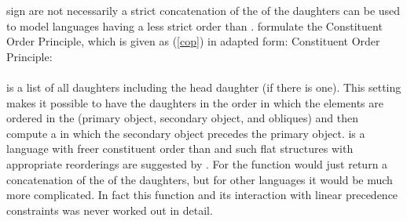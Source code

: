 \documentclass[output=paper,biblatex,babelshorthands,newtxmath,draftmode,colorlinks,citecolor=brown]{langscibook}
\begin{document}
sign are not necessarily a strict concatenation of the \phonvs of the daughters can be used to model
languages having a less strict order than . \citet[]{ps} formulate the Constituent
Order Principle, which is given as (\ref{cop}) in adapted form:
\ea
\label{cop}
Constituent Order Principle:\\
~\\[-3mm]
 \impl 
{}
\z
\dtrs is a list of all daughters including the head daughter (if there is one). This setting makes
it possible to have the daughters in the order in which the elements are ordered in the \compsl
(primary object, secondary object, and obliques) and then compute a \phonv in which the secondary
object precedes the primary object.  is a language with freer constituent order than
 and such flat structures with appropriate reorderings are suggested by \citet{AG2000a}. For
 the function  would just return a concatenation of the \phonvs of the
daughters, but for other languages it would be much more complicated. In fact this function and its
interaction with linear precedence constraints was never worked out in detail.
\end{document}
